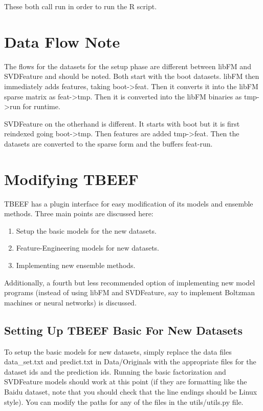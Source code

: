 \documentclass{article}
\begin{document}
These both call run in order to run the R script.

\section{Data Flow Note}

The flows for the datasets for the setup phase are different between
libFM and SVDFeature and should be noted. Both start with the boot
datasets. libFM then immediately adds features, taking
boot-\textgreater{}feat. Then it converts it into the libFM sparse
matrix as feat-\textgreater{}tmp. Then it is converted into the libFM
binaries as tmp-\textgreater{}run for runtime.

SVDFeature on the otherhand is different. It starts with boot but it is first reindexed going boot-\textgreater{}tmp. Then features are added tmp-\textgreater{}feat. Then the datasets are converted to the sparse form and the buffers feat-run.

\section{Modifying TBEEF}

TBEEF has a plugin interface for easy modification of its models and ensemble methods. Three main points are discussed here:

\begin{enumerate}
\item Setup the basic models for the new datasets.
\item Feature-Engineering models for new datasets.
\item Implementing new ensemble methods.
\end{enumerate}

Additionally, a fourth but less recommended option of implementing new model programs (instead of using libFM and SVDFeature, say to implement Boltzman machines or neural networks) is discussed.

\subsection{Setting Up TBEEF Basic For New Datasets}

To setup the basic models for new datasets, simply replace the data files data\_set.txt and predict.txt in Data/Originals with the appropriate files for the dataset ids and the prediction ids. Running the basic factorization and SVDFeature models should work at this point (if they are formatting like the Baidu dataset, note that you should check that the line endings should be Linux style). You can modify the paths for any of the files in the utils/utils.py file.
\end{document}
